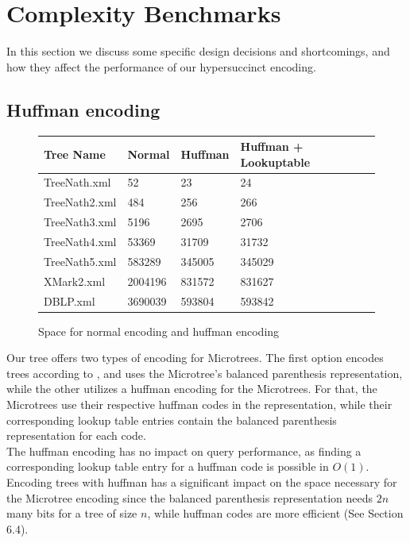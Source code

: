 \documentclass{article}
\begin{document}
\section{Complexity Benchmarks}
In this section we discuss some specific design decisions and shortcomings, and how they affect the performance of our hypersuccinct encoding.
\subsection{Huffman encoding}
\begin{figure}[h]
	\begin{tabular}{ |p{3cm}||p{2cm}|p{2cm}|p{4cm}|  }
		 \hline
		 Tree Name & Normal &Huffman &Huffman + Lookuptable\\
		 \hline
		 TreeNath.xml   & 52    & 23 &   24 \\
		 TreeNath2.xml&   484  & 256   & 266 \\
		 TreeNath3.xml&5196 &2695&  2706\\
		 TreeNath4.xml&53369& 31709&  31732\\
		 TreeNath5.xml&583289&345005&345029\\
		 XMark2.xml&2004196&831572&831627\\
		 DBLP.xml&3690039&593804&593842\\
		 \hline
	\end{tabular}
\caption{Space for normal encoding and huffman encoding}
\label{huff:table1}
\end{figure}
Our tree offers two types of encoding for Microtrees. The first option encodes trees according to \cite{farzanMunro}, and uses the Microtree's balanced parenthesis representation, while the other utilizes a huffman encoding for the Microtrees. For that, the Microtrees use their respective huffman codes in the representation, while their corresponding lookup table entries contain the balanced parenthesis representation for each code.\\
The huffman encoding has no impact on query performance, as finding a corresponding lookup table entry for a huffman code is possible in $O(1)$. Encoding trees with huffman has a significant impact on the space necessary for the Microtree encoding since the balanced parenthesis representation needs $2n$ many bits for a tree of size $n$, while huffman codes are more efficient (See Section 6.4).
\end{document}
